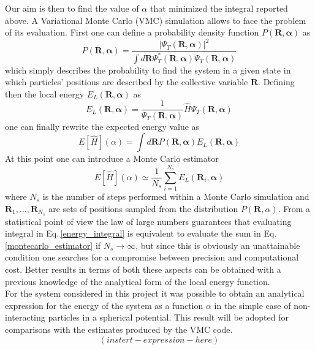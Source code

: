 Our aim is then to find the value of $\alpha$ that minimized the integral reported above. A Variational Monte Carlo (VMC) simulation allows to face the problem of its evaluation. First one can define a probability density function $P(\bm{R}, \bm{\alpha})$ as
\begin{equation*}
    P(\bm{R}, \bm{\alpha}) = \frac{\vert \Psi_T (\bm{R}, \bm{\alpha}) \vert^2}{\int d\bm{R} \Psi_T^*(\bm{R}, \bm{\alpha}) \Psi_T(\bm{R}, \bm{\alpha}) }
\end{equation*}
which simply describes the probability to find the system in a given state in which particles' positions are described by the collective variable $\bm{R}$. Defining then the local energy $E_L (\bm{R}, \bm{\alpha})$ as 
\begin{equation}
    E_L(\bm{R}, \bm{\alpha}) = \frac{1}{\Psi_T(\bm{R}, \bm{\alpha})} \hat{H} \Psi_T(\bm{R}, \bm{\alpha})
    \label{local_energy}
\end{equation}
one can finally rewrite the expected energy value as
\begin{equation}
    E[\hat{H}](\alpha) = \int d\bm{R} P(\bm{R}, \bm{\alpha}) E_L(\bm{R}, \bm{\alpha})
    \label{energy_integral}
\end{equation}
At this point one can introduce a Monte Carlo estimator
\begin{equation}
    E[\hat{H}](\alpha) \simeq \frac{1}{N_s} \sum_{i=1}^{N_s} E_L(\bm{R}_i, \bm{\alpha})
    \label{montecarlo_estimator}
\end{equation}
where $N_s$ is the number of steps performed within a Monte Carlo simulation and $\bm{R}_1, \dots, \bm{R}_{N_s}$ are sets of positions sampled from the distribution $P(\bm{R}, \alpha)$. From a statistical point of view the law of large numbers guarantees that evaluating integral in Eq.\,\ref{energy_integral} is equivalent to evaluate the sum in Eq.\,\ref{montecarlo_estimator} if $N_s \to \infty$, but since this is obviously an unattainable condition one searches for a compromise between precision and computational cost. Better results in terms of both these aspects can be obtained with a previous knowledge of the analytical form of the local energy function. \\
For the system considered in this project it was possible to obtain an analytical expression for the energy of the system as a function $\alpha$ in the simple case of non-interacting particles in a spherical potential. This result will be adopted for comparisons with the estimates produced by the VMC code.
\begin{equation*}
    (instert-expression-here)
\end{equation*}



